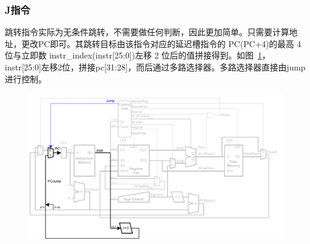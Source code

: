 \subsubsection{J指令}
跳转指令实际为无条件跳转，不需要做任何判断，因此更加简单。只需要计算地址，更改PC即可。其跳转目标由该指令对应的延迟槽指令的 PC(PC+4)的最高 4 位与立即数 instr\_index(instr[25:0])左移 2 位后的值拼接得到。如图~\ref{fig:j}，instr[25:0]左移2位，拼接pc[31:28]，而后通过多路选择器。多路选择器直接由jump进行控制。
\begin{figure}[htbp]
	\centering
	\includegraphics[width=1.0\textwidth]{image/j.pdf}
	\caption{\label{fig:j}}
\end{figure}